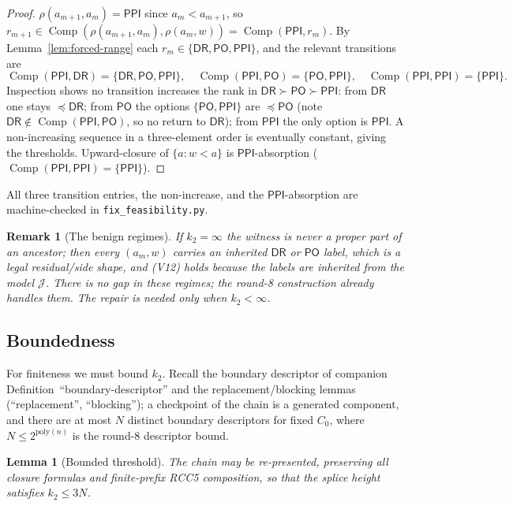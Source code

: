 \documentclass[11pt]{article}
\newtheorem{lemma}[theorem]{Lemma}
\newtheorem{remark}[theorem]{Remark}
\newcommand{\DR}{\mathsf{DR}}
\newcommand{\PO}{\mathsf{PO}}
\newcommand{\PPI}{\mathsf{PPI}}
\newcommand{\comp}{\operatorname{Comp}}
\newcommand{\J}{\mathcal J}
\begin{document}
\begin{proof}
$\rho(a_{m+1},a_m)=\PPI$ since $a_m<a_{m+1}$, so
$r_{m+1}\in\comp(\rho(a_{m+1},a_m),\rho(a_m,w))=\comp(\PPI,r_m)$.  By
Lemma~\ref{lem:forced-range} each $r_m\in\{\DR,\PO,\PPI\}$, and the relevant
transitions are
\[
  \comp(\PPI,\DR)=\{\DR,\PO,\PPI\},\quad
  \comp(\PPI,\PO)=\{\PO,\PPI\},\quad
  \comp(\PPI,\PPI)=\{\PPI\}.
\]
Inspection shows no transition increases the rank in $\DR\succ\PO\succ\PPI$:
from $\DR$ one stays $\preceq\DR$; from $\PO$ the options $\{\PO,\PPI\}$ are
$\preceq\PO$ (note $\DR\notin\comp(\PPI,\PO)$, so no return to $\DR$); from
$\PPI$ the only option is $\PPI$.  A non-increasing sequence in a three-element
order is eventually constant, giving the thresholds.  Upward-closure of
$\{a:w<a\}$ is $\PPI$-absorption ($\comp(\PPI,\PPI)=\{\PPI\}$).
\end{proof}

All three transition entries, the non-increase, and the $\PPI$-absorption are
machine-checked in \texttt{fix\_feasibility.py}.

\begin{remark}[The benign regimes]
If $k_2=\infty$ the witness is never a proper part of an ancestor; then every
$(a_m,w)$ carries an inherited $\DR$ or $\PO$ label, which is a legal
residual/side shape, and (V12) holds because the labels are inherited from the
model $\J$.  There is \emph{no gap} in these regimes; the round-8 construction
already handles them.  The repair is needed only when $k_2<\infty$.
\end{remark}

\subsection{Boundedness}

For finiteness we must bound $k_2$.  Recall the boundary descriptor of companion
Definition~``boundary-descriptor'' and the replacement/blocking lemmas
(``replacement'', ``blocking''); a checkpoint of the chain is a generated
component, and there are at most $N$ distinct boundary descriptors for fixed
$C_0$, where $N\le 2^{\mathrm{poly}(n)}$ is the round-8 descriptor bound.

\begin{lemma}[Bounded threshold]\label{lem:bounded}
The chain may be re-presented, preserving all closure formulas and finite-prefix
RCC5 composition, so that the splice height satisfies $k_2\le 3N$.
\end{lemma}
\end{document}
